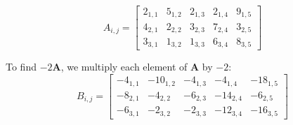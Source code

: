 
\[
\boldsymbol{\mathit{A}}_{i,j} = 
\begin{bmatrix}
    2_{1,1} & 5_{1,2} & 2_{1,3} & 2_{1,4} & 9_{1,5} \\
    4_{2,1} & 2_{2,2} & 3_{2,3} & 7_{2,4} & 3_{2,5} \\
    3_{3,1} & 1_{3,2} & 1_{3,3} & 6_{3,4} & 8_{3,5}
\end{bmatrix}
\]

To find $-2\mathbf{A}$, we multiply each element of $\mathbf{A}$ by $-2$:
\[
\boldsymbol{\mathit{B}}_{i,j} = 
\begin{bmatrix}
    -4_{1,1} & -10_{1,2} & -4_{1,3} & -4_{1,4} & -18_{1,5} \\
    -8_{2,1} & -4_{2,2} & -6_{2,3} & -14_{2,4} & -6_{2,5} \\
    -6_{3,1} & -2_{3,2} & -2_{3,3} & -12_{3,4} & -16_{3,5}
\end{bmatrix}
\]



